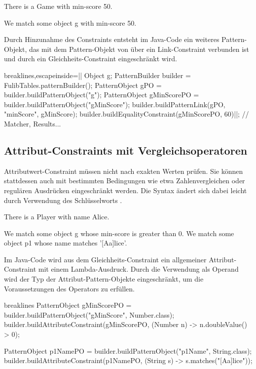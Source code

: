 \begin{mdcodeblock}
    There is a Game with min-score 50.

    We match some object g with min-score 50.
\end{mdcodeblock}

Durch Hinzunahme des Constraints entsteht im Java-Code ein weiteres Pattern-Objekt, das mit dem Pattern-Objekt von  über ein Link-Constraint verbunden ist und durch ein Gleichheits-Constraint eingeschränkt wird.

\begin{jcodeblock*}{breaklines,escapeinside=||}
    Object g;
    {
        PatternBuilder builder = FulibTables.patternBuilder();
        PatternObject gPO = builder.buildPatternObject("g");
        PatternObject gMinScorePO = builder.buildPatternObject("gMinScore");
        builder.buildPatternLink(gPO, "minScore", gMinScore);
        builder.buildEqualityConstraint(gMinScorePO, 60)|\footnotemark|;
        // Matcher, Results...
    }
\end{jcodeblock*}

\subsection{Attribut-Constraints mit Vergleichsoperatoren}

Attributwert-Constraint müssen nicht nach exakten Werten prüfen.
Sie können stattdessen auch mit bestimmten Bedingungen wie etwa Zahlenvergleichen oder regulären Ausdrücken eingeschränkt werden.
Die Syntax ändert sich dabei leicht durch Verwendung des Schlüsselworts .

\begin{mdcodeblock}
    There is a Player with name Alice.

    We match some object g whose min-score is greater than 0.
    We match some object p1 whose name matches '[Aa]lice'.
\end{mdcodeblock}

Im Java-Code wird aus dem Gleichheits-Constraint ein allgemeiner Attribut-Constraint mit einem Lambda-Ausdruck.
Durch die Verwendung als Operand wird der Typ der Attribut-Pattern-Objekte eingeschränkt, um die Voraussetzungen des Operators zu erfüllen.

\begin{jcodeblock*}{breaklines}
    PatternObject gMinScorePO = builder.buildPatternObject("gMinScore", Number.class);
    builder.buildAttributeConstraint(gMinScorePO, (Number n) -> n.doubleValue() > 0);

    PatternObject p1NamePO = builder.buildPatternObject("p1Name", String.class);
    builder.buildAttributeConstraint(p1NamePO, (String s) -> s.matches("[Aa]lice"));
\end{jcodeblock*}

